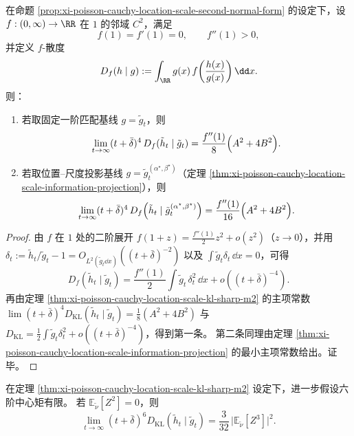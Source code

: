 \begin{corollary}\label{cor:xi-poisson-cauchy-location-scale-fdiv-projection-constants}
在命题 \ref{prop:xi-poisson-cauchy-location-scale-second-normal-form} 的设定下，设 \(f:(0,\infty)\to\RR\) 在 \(1\) 的邻域 \(C^2\)，满足
\[
f(1)=f'(1)=0,\qquad f''(1)>0,
\]
并定义 \(f\)-散度
\[
D_f(h\mid g):=\int_{\RR} g(x)\,f\!\left(\frac{h(x)}{g(x)}\right)\dd x.
\]
则：
\begin{enumerate}
  \item 若取固定一阶匹配基线 \(g=\tilde g_t\)，则
  \[
  \lim_{t\to\infty}(t+\bar\delta)^4\,D_f(\tilde h_t\mid \tilde g_t)
  =\frac{f''(1)}{8}\Bigl(A^2+4B^2\Bigr).
  \]
  \item 若取位置--尺度投影基线 \(g=\tilde g_t^{(\alpha^\star,\beta^\star)}\)（定理 \ref{thm:xi-poisson-cauchy-location-scale-information-projection}），则
  \[
  \lim_{t\to\infty}(t+\bar\delta)^4\,D_f\!\left(\tilde h_t\mid \tilde g_t^{(\alpha^\star,\beta^\star)}\right)
  =\frac{f''(1)}{16}\Bigl(A^2+4B^2\Bigr).
  \]
\end{enumerate}
\end{corollary}
\begin{proof}
由 \(f\) 在 \(1\) 处的二阶展开
\(
f(1+z)=\frac{f''(1)}{2}z^2+o(z^2)
\)（\(z\to 0\)），并用
\(
\delta_t:=\tilde h_t/\tilde g_t-1=O_{L^2(\tilde g_t\dd x)}((t+\bar\delta)^{-2})
\)
以及 \(\int \tilde g_t\delta_t\,\dd x=0\)，可得
\[
D_f(\tilde h_t\mid \tilde g_t)=\frac{f''(1)}{2}\int \tilde g_t\,\delta_t^2\,\dd x+o((t+\bar\delta)^{-4}).
\]
再由定理 \ref{thm:xi-poisson-cauchy-location-scale-kl-sharp-m2} 的主项常数
\(
\lim (t+\bar\delta)^4D_{\mathrm{KL}}(\tilde h_t\mid \tilde g_t)=\frac18(A^2+4B^2)
\)
与 \(D_{\mathrm{KL}}=\frac12\int \tilde g_t\delta_t^2+o((t+\bar\delta)^{-4})\)，得到第一条。
第二条同理由定理 \ref{thm:xi-poisson-cauchy-location-scale-information-projection} 的最小主项常数给出。证毕。
\end{proof}

\begin{corollary}[二阶盲点后的六次衰减常数]\label{cor:xi-poisson-cauchy-location-scale-m2-blind-m3-kl}
在定理 \ref{thm:xi-poisson-cauchy-location-scale-kl-sharp-m2} 设定下，进一步假设六阶中心矩有限。
若 \(\mathbb E_{\tilde\nu}[Z^2]=0\)，则
\[
\lim_{t\to\infty}(t+\bar\delta)^6 D_{\mathrm{KL}}(\tilde h_t\mid \tilde g_t)
=\frac{3}{32}\,\bigl|\mathbb E_{\tilde\nu}[Z^3]\bigr|^2.
\]
\end{corollary}

